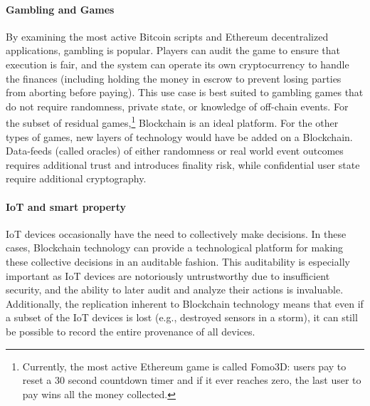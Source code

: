 \paragraph{Gambling and Games}
By examining the most active Bitcoin scripts and Ethereum decentralized applications, gambling is popular. Players can audit the game to ensure that execution is fair, and the system can operate its own cryptocurrency to handle the finances (including holding the money in escrow to prevent losing parties from aborting before paying). This use case is best suited to gambling games that do not require randomness, private state, or knowledge of off-chain events. For the subset of residual games,\footnote{Currently, the most active Ethereum game is called Fomo3D: users pay to reset a 30 second countdown timer and if it ever reaches zero, the last user to pay wins all the money collected.} Blockchain is an ideal platform. For the other types of games, new layers of technology would have be added on a Blockchain. Data-feeds (called oracles) of either randomness or real world event outcomes requires additional trust and introduces finality risk, while confidential user state require additional cryptography.  

\paragraph{IoT and smart property}
IoT devices occasionally have the need to collectively make decisions.
In these cases, Blockchain technology can provide a technological platform for making these collective decisions in an auditable fashion.
This auditability is especially important as IoT devices are notoriously untrustworthy due to insufficient security, and the ability to later audit and analyze their actions is invaluable.
Additionally, the replication inherent to Blockchain technology means that even if a subset of the IoT devices is lost (e.g., destroyed sensors in a storm), it can still be possible to record the entire provenance of all devices.



